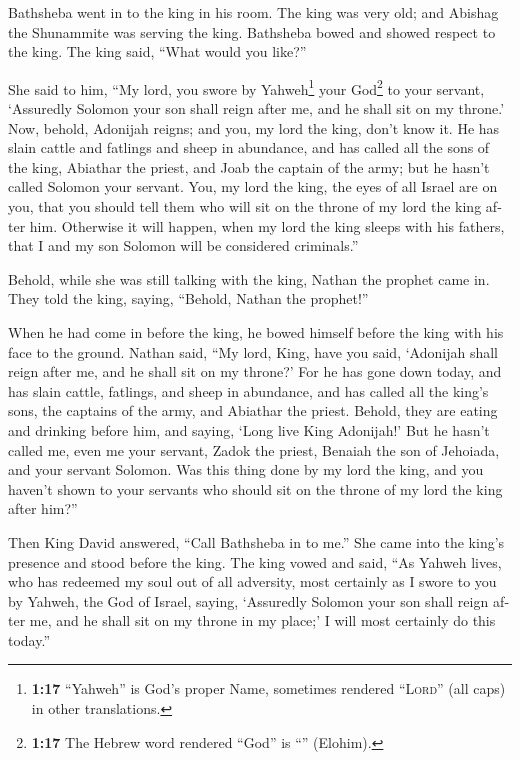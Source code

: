 \begin{paracol}{2}
\begin{otherlanguage}{english}
 Bathsheba went in to the king in his room. The king was
very old; and Abishag the Shunammite was serving the king.
 Bathsheba bowed and showed respect to the king. The king
said, ``What would you like?''

 She said to him, ``My lord, you swore by
Yahweh\footnote{\textbf{1:17} ``Yahweh'' is God's proper Name, sometimes
  rendered ``\textsc{Lord}'' (all caps) in other translations.} your
God\footnote{\textbf{1:17} The Hebrew word rendered ``God'' is
  ``'' (Elohim).} to your servant, `Assuredly Solomon your
son shall reign after me, and he shall sit on my throne.'
 Now, behold, Adonijah reigns; and you, my lord the king,
don't know it.  He has slain cattle and fatlings and
sheep in abundance, and has called all the sons of the king, Abiathar
the priest, and Joab the captain of the army; but he hasn't called
Solomon your servant.  You, my lord the king, the eyes of
all Israel are on you, that you should tell them who will sit on the
throne of my lord the king after him.  Otherwise it will
happen, when my lord the king sleeps with his fathers, that I and my son
Solomon will be considered criminals.''

 Behold, while she was still talking with the king,
Nathan the prophet came in.  They told the king, saying,
``Behold, Nathan the prophet!''

When he had come in before the king, he bowed himself before the king
with his face to the ground.  Nathan said, ``My lord,
King, have you said, `Adonijah shall reign after me, and he shall sit on
my throne?'  For he has gone down today, and has slain
cattle, fatlings, and sheep in abundance, and has called all the king's
sons, the captains of the army, and Abiathar the priest. Behold, they
are eating and drinking before him, and saying, `Long live King
Adonijah!'  But he hasn't called me, even me your
servant, Zadok the priest, Benaiah the son of Jehoiada, and your servant
Solomon.  Was this thing done by my lord the king, and
you haven't shown to your servants who should sit on the throne of my
lord the king after him?''

 Then King David answered, ``Call Bathsheba in to me.''
She came into the king's presence and stood before the king.
 The king vowed and said, ``As Yahweh lives, who has
redeemed my soul out of all adversity,  most certainly as
I swore to you by Yahweh, the God of Israel, saying, `Assuredly Solomon
your son shall reign after me, and he shall sit on my throne in my
place;' I will most certainly do this today.''


\end{otherlanguage}
\end{paracol}
